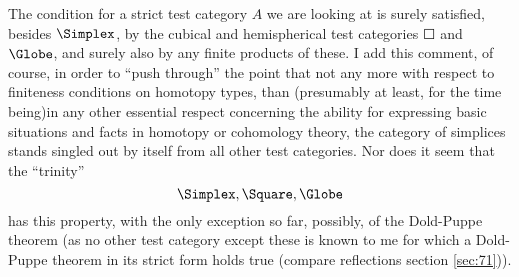 The condition for a strict test category $A$ we are looking at is
surely satisfied, besides $\Simplex$, by the cubical and hemispherical
test categories $\Square$ and $\Globe$, and surely also by any finite
products of these. I add this comment, of course, in order to ``push
through'' the point that not any more with respect to finiteness
conditions on homotopy types, than (presumably at least, for the time
being)in any other essential respect concerning the ability for
expressing basic situations and facts in homotopy or cohomology
theory, the category of simplices stands singled out by itself from
all other test categories. Nor does it seem that the ``trinity''
\[ \Simplex, \Square, \Globe\]
has this property, with the only exception so far, possibly, of the
Dold-Puppe theorem (as no other test category except these is known to
me for which a Dold-Puppe theorem in its strict form holds true
(compare reflections section \ref{sec:71})).


